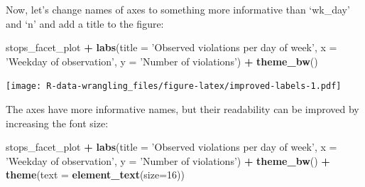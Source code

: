 \documentclass[]{book}
\newenvironment{Shaded}{\begin{snugshade}}{\end{snugshade}}
\newcommand{\KeywordTok}[1]{\textcolor[rgb]{0.13,0.29,0.53}{\textbf{#1}}}
\newcommand{\DataTypeTok}[1]{\textcolor[rgb]{0.13,0.29,0.53}{#1}}
\newcommand{\DecValTok}[1]{\textcolor[rgb]{0.00,0.00,0.81}{#1}}
\newcommand{\StringTok}[1]{\textcolor[rgb]{0.31,0.60,0.02}{#1}}
\newcommand{\OtherTok}[1]{\textcolor[rgb]{0.56,0.35,0.01}{#1}}
\newcommand{\OperatorTok}[1]{\textcolor[rgb]{0.81,0.36,0.00}{\textbf{#1}}}
\newcommand{\NormalTok}[1]{#1}
\theoremstyle{definition}
\theoremstyle{definition}
\theoremstyle{definition}
\theoremstyle{remark}
\begin{document}
\begin{Shaded}
\end{Shaded}

Now, let's change names of axes to something more informative than
`wk\_day' and `n' and add a title to the figure:

\begin{Shaded}
\begin{Highlighting}[]
\NormalTok{stops_facet_plot }\OperatorTok{+}
\StringTok{  }\KeywordTok{labs}\NormalTok{(}\DataTypeTok{title =} \StringTok{'Observed violations per day of week'}\NormalTok{,}
         \DataTypeTok{x =} \StringTok{'Weekday of observation'}\NormalTok{,}
         \DataTypeTok{y =} \StringTok{'Number of violations'}\NormalTok{) }\OperatorTok{+}
\StringTok{  }\KeywordTok{theme_bw}\NormalTok{()}
\end{Highlighting}
\end{Shaded}

\texttt{[image: R-data-wrangling\_files/figure-latex/improved-labels-1.pdf]}

The axes have more informative names, but their readability can be
improved by increasing the font size:

\begin{Shaded}
\begin{Highlighting}[]
\NormalTok{stops_facet_plot }\OperatorTok{+}
\StringTok{  }\KeywordTok{labs}\NormalTok{(}\DataTypeTok{title =} \StringTok{'Observed violations per day of week'}\NormalTok{,}
         \DataTypeTok{x =} \StringTok{'Weekday of observation'}\NormalTok{,}
         \DataTypeTok{y =} \StringTok{'Number of violations'}\NormalTok{) }\OperatorTok{+}
\StringTok{  }\KeywordTok{theme_bw}\NormalTok{() }\OperatorTok{+}\StringTok{ }
\StringTok{  }\KeywordTok{theme}\NormalTok{(}\DataTypeTok{text =} \KeywordTok{element_text}\NormalTok{(}\DataTypeTok{size=}\DecValTok{16}\NormalTok{))}
\end{Highlighting}
\end{Shaded}
\end{document}
